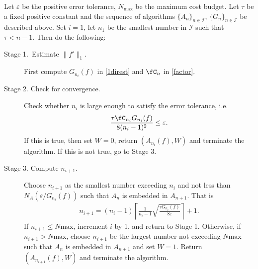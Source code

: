 \begin{algo} \label{multistageintegalgo}
 Let $\varepsilon$ be the positive error tolerance, $N_{\text{max}}$ be the maximum cost budget. Let $\tau$ be a fixed positive constant and the sequence of algorithms $\{A_n\}_{n\in \mathcal{I}}$, $\{G_n\}_{n\in \mathcal{I}}$ be described above. Set $i=1$, let $n_1$ be the smallest number in $\mathcal{I}$ such that $\tau < n-1$. Then do the following:
\begin{description}
\item[Stage 1.\ Estimate {$\|f'\|_{1}$}.] First compute $G_{n_i}(f)$ in \eqref{1direst} and $\fC_n$ in \eqref{factor}.

\item[Stage 2. Check for convergence.] Check whether $n_i$ is large enough to satisfy the error tolerance, i.e.
    \begin{align*}
      \frac{\tau \fC_{n_i} G_{n_i}(f)}{8(n_i-1)^2} \le \varepsilon.
    \end{align*}
    If this is true, then set $W=0$, return $(A_{n_i}(f),W)$ and terminate the algorithm. If this is not true, go to Stage 3.

\item[Stage 3. Compute $n_{i+1}$.] Choose $n_{i+1}$ as the smallest number exceeding $n_i$ and not less than $N_A(\varepsilon/G_{n_i}(f))$ such that $A_n$ is embedded in $A_{n+1}$. That is
    \begin{align*}
      n_{i+1}=(n_i-1)\left\lceil\frac{1}{n_{i}-1}\sqrt{\frac{\tau G_{n_i}(f)}{8\varepsilon}}\right\rceil+1.
    \end{align*}
    If $n_{i+1}\leq N{\text{max}}$, increment $i$ by 1, and return to Stage 1. Otherwise, if $n_{i+1}> N{\text{max}}$, choose $n_{i+1}$ be the largest number not exceeding $N{\text{max}}$ such that $A_n$ is embedded in $A_{n+1}$ and set $W=1$. Return $(A_{n_{i+1}}(f),W)$ and terminate the algorithm.
\end{description}
\end{algo}

